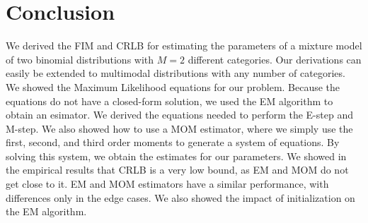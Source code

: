 \section{Conclusion}


We derived the FIM and CRLB for estimating the parameters of a mixture model of two binomial distributions with $M=2$ different categories. 
Our derivations can easily be extended to multimodal distributions with any number of categories.
We showed the Maximum Likelihood equations for our problem.
Because the equations do not have a closed-form solution, we used the EM algorithm to obtain an esimator. We derived the equations needed to perform the E-step and M-step.
We also showed how to use a MOM estimator, where we simply use the first, second, and third order moments to generate a system of equations. By solving this system, we obtain the estimates for our parameters.
We showed in the empirical results that CRLB is a very low bound, as EM and MOM do not get close to it.
EM and MOM estimators have a similar performance, with differences only in the edge cases.
We also showed the impact of initialization on the EM algorithm. 